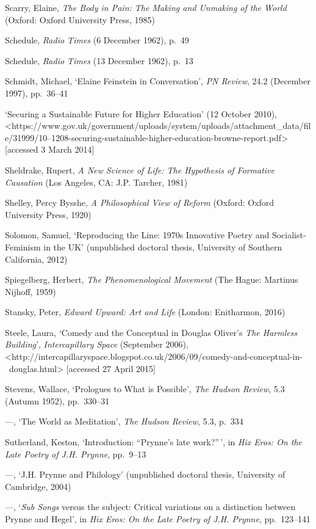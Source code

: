 \documentclass[]{article}
\begin{document}
Scarry, Elaine, \emph{The Body in Pain: The Making and Unmaking of the
World} (Oxford: Oxford University Press, 1985)

Schedule, \emph{Radio Times} (6 December 1962), p.~49

Schedule, \emph{Radio Times} (13 December 1962), p.~13

Schmidt, Michael, `Elaine Feinstein in Conversation', \emph{PN Review},
24.2 (December 1997), pp.~36--41

`Securing a Sustainable Future for Higher Education' (12 October
2010),\\
\textless{}https://www.gov.uk/government/uploads/system/uploads/attachment\_data/file/31999/10--1208-securing-sustainable-higher-education-browne-report.pdf\textgreater{}
{[}accessed 3 March 2014{]}

Sheldrake, Rupert, \emph{A New Science of Life: The Hypothesis of
Formative Causation} (Los Angeles, CA: J.P. Tarcher, 1981)

Shelley, Percy Bysshe, \emph{A Philosophical View of Reform} (Oxford:
Oxford University Press, 1920)

Solomon, Samuel, `Reproducing the Line: 1970s Innovative Poetry and
Socialist-Feminism in the UK' (unpublished doctoral thesis, University
of Southern California, 2012)

Spiegelberg, Herbert, \emph{The Phenomenological Movement} (The Hague:
Martinus Nijhoff, 1959)

Stansky, Peter, \emph{Edward Upward: Art and Life} (London: Enitharmon,
2016)

Steele, Laura, `Comedy and the Conceptual in Douglas Oliver's \emph{The
Harmless Building}', \emph{Intercapillary Space} (September 2006),\\
\textless{}http://intercapillaryspace.blogspot.co.uk/2006/09/comedy-and-conceptual-in-~douglas.html\textgreater{}
{[}accessed 27 April 2015{]}

Stevens, Wallace, `Prologues to What is Possible', \emph{The Hudson
Review}, 5.3 (Autumn 1952), pp.~330--31

---, `The World as Meditation', \emph{The Hudson Review}, 5.3, p.~334

Sutherland, Keston, `Introduction: ``Prynne's late work?''\,', in
\emph{Hix Eros: On the Late Poetry of J.H. Prynne}, pp.~9--13

---, `J.H. Prynne and Philology' (unpublished doctoral thesis,
University of Cambridge, 2004)

---, `\emph{Sub Songs} versus the subject: Critical variations on a
distinction between Prynne and Hegel', in \emph{Hix Eros: On the Late
Poetry of J.H. Prynne}, pp.~123--141
\end{document}
